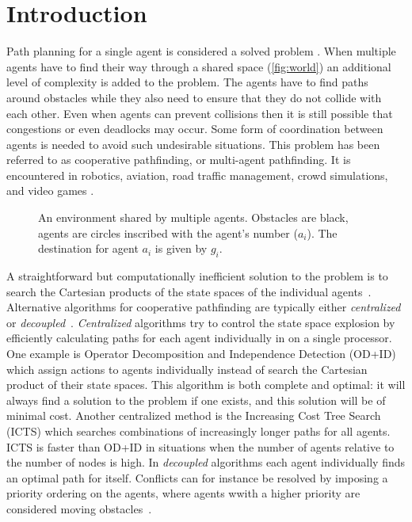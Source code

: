 \section{Introduction}\label{sec:intro}
Path planning for a single agent is considered a solved problem
\cite{sharon2013}. When multiple agents have to find their way through a
shared space (\autoref{fig:world}) an additional level of complexity is added 
to the problem. The agents have to find paths
around obstacles while they also need to ensure that they do not collide with
each other. Even when agents can prevent collisions then it is still possible
that congestions or even deadlocks may occur. Some form of coordination between 
agents is needed to avoid such undesirable situations. This problem has been 
referred to as cooperative pathfinding, or multi-agent pathfinding. It is 
encountered in robotics, aviation, road traffic management, crowd simulations, 
and video games \cite{standley2011}.

\begin{figure}[t]
    \centering
    \def\svgscale{.5}
    
    \caption{An environment shared by multiple agents. Obstacles are black,
        agents are circles inscribed with the agent's number ($a_i$). The 
        destination for agent $a_i$ is given by $g_i$.}
    \label{fig:world}
\end{figure}

A straightforward but computationally inefficient solution to the problem is to 
search the Cartesian products of the state spaces of the individual 
agents~\cite{hopcroft1984}. Alternative algorithms for cooperative pathfinding 
are typically either \emph{centralized} or \emph{decoupled}~\cite{latombe1991}.
\emph{Centralized} algorithms try to control the state space explosion by 
efficiently calculating paths for each agent individually in on a single 
processor. One example is Operator Decomposition and Independence Detection 
(OD+ID)~\cite{standley2010,standley2011} which assign actions to agents 
individually instead of search the Cartesian product of their state spaces. 
This algorithm is both complete and 
optimal: it will always find a solution to the problem if one exists, and this 
solution will be of minimal cost.
Another centralized method is the Increasing Cost Tree 
Search (ICTS) \cite{sharon2013} which searches combinations of increasingly 
longer paths for all agents. ICTS is faster than OD+ID in situations when the 
number of agents relative to the number of nodes is high.
In \emph{decoupled} algorithms each agent individually finds an optimal path 
for itself. Conflicts can for instance be resolved by imposing a priority 
ordering on the agents, where agents wwith a higher priority are considered 
moving obstacles~\cite{bennewitz2002}.

